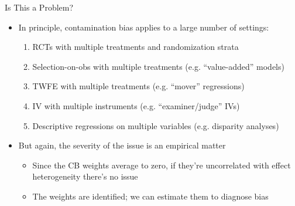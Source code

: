 \documentclass[11pt,english]{beamer}
\begin{document}
\begin{frame}{Is This a Problem?}
\begin{itemize}
\item In principle, contamination bias applies to a large number of settings:\smallskip
\begin{enumerate}
\item RCTs with multiple treatments and randomization strata\smallskip
\item Selection-on-obs with multiple treatments (e.g. ``value-added'' models)\smallskip
\item TWFE with multiple treatments (e.g. ``mover'' regressions)\smallskip
\item IV with multiple instruments (e.g. ``examiner/judge'' IVs)\smallskip
\item Descriptive regressions on multiple variables (e.g. disparity analyses)
\end{enumerate}\bigskip\pause{}

\item But again, the severity of the issue is an empirical matter\smallskip
\begin{itemize}
\item Since the CB weights average to zero, if they're uncorrelated with effect heterogeneity there's no issue\smallskip
\item The weights are identified; we can estimate them to diagnose bias
\end{itemize}
\end{itemize}
\end{frame}
\end{document}
